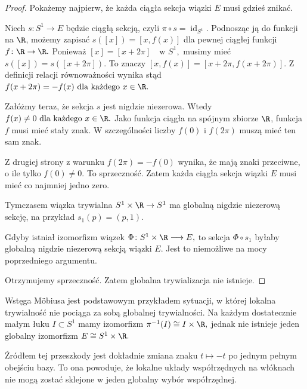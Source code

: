 \begin{proof}
Pokażemy najpierw, że każda ciągła sekcja wiązki $E$
musi gdzieś znikać.

Niech
$
s\colon S^1\to E
$
będzie ciągłą sekcją, czyli
$
\pi\circ s=\operatorname{id}_{S^1}.
$
Podnosząc ją do funkcji na $\R$, możemy zapisać
$
s([x])=[x,f(x)]
$
dla pewnej ciągłej funkcji
$
f\colon\R\to\R.
$
Ponieważ
$
[x]=[x+2\pi]
\quad\text{w }S^1,
$
musimy mieć
$
s([x])=s([x+2\pi]).
$
To znaczy
$
[x,f(x)]=[x+2\pi,f(x+2\pi)].
$
Z definicji relacji równoważności wynika stąd
$
f(x+2\pi)=-f(x)
\ \text{dla każdego }x\in\R.
$

Załóżmy teraz, że sekcja $s$ jest nigdzie niezerowa.
Wtedy
$
f(x)\neq 0
\ \text{dla każdego }x\in\R.
$
Jako funkcja ciągła na spójnym zbiorze $\R$,
funkcja $f$ musi mieć stały znak.
W szczególności liczby $f(0)$ i $f(2\pi)$
muszą mieć ten sam znak.

Z drugiej strony z warunku
$
f(2\pi)=-f(0)
$
wynika, że mają znaki przeciwne, o ile tylko $f(0)\neq 0$.
To sprzeczność. Zatem każda ciągła sekcja wiązki $E$
musi mieć co najmniej jedno zero.

Tymczasem wiązka trywialna
$
S^1\times\R\to S^1
$
ma globalną nigdzie niezerową sekcję, na przykład
$
s_1(p)=(p,1).
$

Gdyby istniał izomorfizm wiązek
$
\Phi\colon S^1\times\R\longrightarrow E,
$
to sekcja
$
\Phi\circ s_1
$
byłaby globalną nigdzie niezerową sekcją wiązki $E$.
Jest to niemożliwe na mocy poprzedniego argumentu.

Otrzymujemy sprzeczność. Zatem globalna trywializacja nie istnieje.
\end{proof}

\begin{uwaga}
Wstęga Möbiusa jest podstawowym przykładem sytuacji, w której
lokalna trywialność nie pociąga za sobą globalnej trywialności.
Na każdym dostatecznie małym łuku
$
I\subset S^1
$
mamy izomorfizm
$
\pi^{-1}(I)\cong I\times\R,
$
jednak nie istnieje jeden globalny izomorfizm
$
E\cong S^1\times\R.
$

Źródłem tej przeszkody jest dokładnie zmiana znaku
$
t\longmapsto -t
$
po jednym pełnym obejściu bazy.
To ona powoduje, że lokalne układy współrzędnych na włóknach
nie mogą zostać sklejone w jeden globalny wybór współrzędnej.
\end{uwaga}

